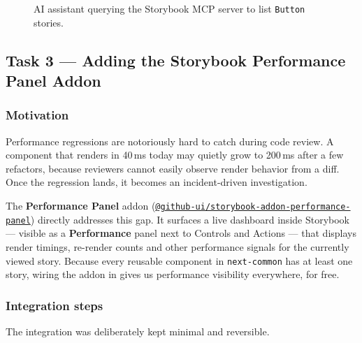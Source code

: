 \begin{figure}[h]
    \centering
    \caption{AI assistant querying the Storybook MCP server to list \texttt{Button} stories.}
    \label{fig:x5-mcp}
\end{figure}

\subsection{Task 3 --- Adding the Storybook Performance Panel Addon}
\label{sec:task3-perf-panel}

\subsubsection{Motivation}

Performance regressions are notoriously hard to catch during code review. A component that renders in 40\,ms today may quietly grow to 200\,ms after a few refactors, because reviewers cannot easily observe render behavior from a diff. Once the regression lands, it becomes an incident-driven investigation.

The \textbf{Performance Panel} addon (\href{https://github.com/github/storybook-addon-performance-panel}{\texttt{@github-ui/storybook-addon-performance-panel}}) directly addresses this gap. It surfaces a live dashboard inside Storybook --- visible as a \textbf{Performance} panel next to Controls and Actions --- that displays render timings, re-render counts and other performance signals for the currently viewed story. Because every reusable component in \texttt{next-common} has at least one story, wiring the addon in gives us performance visibility everywhere, for free.

\subsubsection{Integration steps}

The integration was deliberately kept minimal and reversible.

